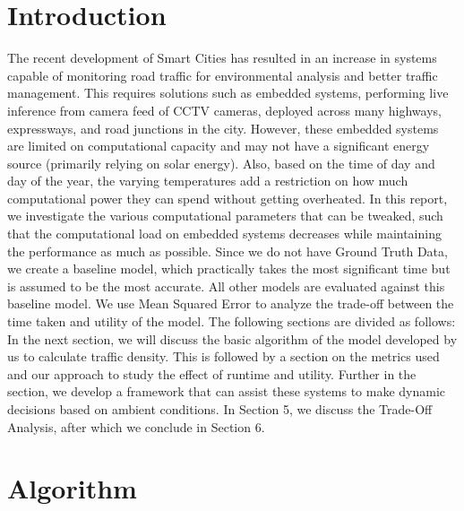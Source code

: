 \documentclass[conference]{IEEEtran}
\begin{document}
\section{Introduction}
The recent development of Smart Cities has resulted in an increase in systems capable of monitoring
road traffic for environmental analysis and better traffic management. This requires solutions such as embedded systems,
performing live inference from camera feed of CCTV cameras, deployed across many highways, expressways, and road junctions in the city.
However, these embedded systems are limited on computational capacity and may not have a significant energy source (primarily relying on solar energy).
Also, based on the time of day and day of the year, the varying temperatures add a restriction on how much computational power they can spend without getting overheated.
In this report, we investigate the various computational parameters that can be tweaked, such that the computational load on embedded systems decreases while maintaining
the performance as much as possible. Since we do not have Ground Truth Data,  we create a baseline model, which practically takes the most significant time but is assumed to be the most accurate.
All other models are evaluated against this baseline model. We use Mean Squared Error to analyze the trade-off between the time taken and utility of the model.
The following sections are divided as follows:
In the next section, we will discuss the basic algorithm of the model developed by us to calculate traffic density. This is followed by a section on the metrics used and our
approach to study the effect of runtime and utility. Further in the section, we develop a framework that can assist these systems to make dynamic decisions based on ambient conditions.
In Section 5, we discuss the Trade-Off Analysis, after which we conclude in Section 6.




\section{Algorithm}
\end{document}
